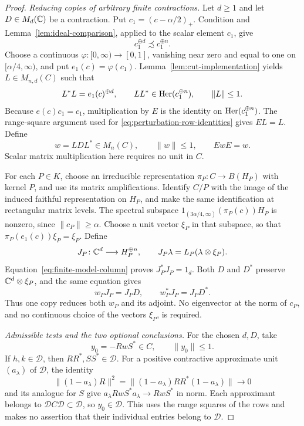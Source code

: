 \begin{proof}
\smallskip
\noindent\emph{Reducing copies of arbitrary finite contractions.}
Let \(d\geq1\) and let \(D\in M_d(\mathbb C)\) be a contraction.
Put \(c_1=(c-\alpha/2)_+\).  Condition \propF{} and
Lemma~\ref{lem:ideal-comparison}, applied to the scalar element
\(c_1\), give
\[
 c_1^{\oplus d}\precsim c_1^{\oplus n}.
\]
Choose a continuous \(\varphi\colon[0,\infty)\to[0,1]\), vanishing
near zero and equal to one on \([\alpha/4,\infty)\), and put
\(e_1(c)=\varphi(c_1)\).  Lemma~\ref{lem:cut-implementation}
yields \(L\in M_{n,d}(C)\) such that
\begin{equation}
 L^*L=e_1(c)^{\oplus d},\qquad
 LL^*\in\operatorname{Her}(c_1^{\oplus n}),\qquad \|L\|\leq1.
 \label{eq:finite-model-column}
\end{equation}
Because \(e(c)c_1=c_1\), multiplication by \(E\) is the identity
on \(\operatorname{Her}(c_1^{\oplus n})\).  The range-square argument used for
\eqref{eq:perturbation-row-identities} gives \(EL=L\).
Define
\begin{equation}
 w=LDL^*\in M_n(C),\qquad \|w\|\leq1,\qquad EwE=w.
 \label{eq:finite-model}
\end{equation}
Scalar matrix multiplication here requires no unit in \(C\).

For each \(P\in K\), choose an irreducible representation
\(\pi_P\colon C\to B(H_P)\) with kernel \(P\), and use its matrix
amplifications.  Identify \(C/P\) with the image of the induced
faithful representation on \(H_P\), and make the same identification
at rectangular matrix levels.  The spectral subspace
\(1_{(3\alpha/4,\infty)}(\pi_P(c))H_P\) is nonzero, since
\(\|c_P\|\geq\alpha\).  Choose a unit vector \(\xi_P\) in that
subspace, so that \(\pi_P(e_1(c))\xi_P=\xi_P\).  Define
\[
 J_P\colon\mathbb C^d\longrightarrow H_P^{\oplus n},\qquad
 J_P\lambda=L_P(\lambda\otimes\xi_P).
\]
Equation~\eqref{eq:finite-model-column} proves \(J_P^*J_P=1_d\).
Both \(D\) and \(D^*\) preserve \(\mathbb C^d\otimes\xi_P\), and the
same equation gives
\begin{equation}
 w_PJ_P=J_PD,\qquad w_P^*J_P=J_PD^*.
 \label{eq:reducing-model}
\end{equation}
Thus one copy reduces both \(w_P\) and its adjoint.  No eigenvector
at the norm of \(c_P\), and no continuous choice of the vectors
\(\xi_P\), is required.

\smallskip
\noindent\emph{Admissible tests and the two optional conclusions.}
For the chosen \(d,D\), take
\[
 y_0=-RwS^*\in C,\qquad\|y_0\|\leq1.
\]
If \(h,k\in\mathcal D\), then \(RR^*,SS^*\in\mathcal D\).
For a positive contractive approximate unit \((a_\lambda)\) of
\(\mathcal D\), the identity
\[
 \|(1-a_\lambda)R\|^2
 =\|(1-a_\lambda)RR^*(1-a_\lambda)\|\longrightarrow0
\]
and its analogue for \(S\) give
\(a_\lambda RwS^*a_\lambda\to RwS^*\) in norm.
Each approximant belongs to
\(\mathcal D C\mathcal D\subset\mathcal D\), so \(y_0\in\mathcal D\).
This uses the range squares of the rows and makes no assertion that
their individual entries belong to \(\mathcal D\).


\end{proof}
